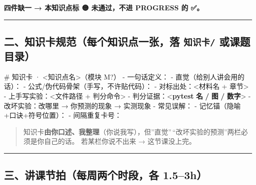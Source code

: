 \documentclass[
  chinese,
  11pt,
]{ctexart}
\newenvironment{Shaded}{}{}
\newcommand{\DataTypeTok}[1]{\textcolor[rgb]{0.56,0.13,0.00}{#1}}
\newcommand{\ErrorTok}[1]{\textcolor[rgb]{1.00,0.00,0.00}{\textbf{#1}}}
\newcommand{\FunctionTok}[1]{\textcolor[rgb]{0.02,0.16,0.49}{#1}}
\newcommand{\KeywordTok}[1]{\textcolor[rgb]{0.00,0.44,0.13}{\textbf{#1}}}
\newcommand{\NormalTok}[1]{#1}
\newcommand{\OtherTok}[1]{\textcolor[rgb]{0.00,0.44,0.13}{#1}}
\newcommand{\SpecialStringTok}[1]{\textcolor[rgb]{0.73,0.40,0.53}{#1}}
\begin{document}
\textbf{四件缺一 → 本知识点标 🟡 未通过，不进 PROGRESS 的 ✅。}

\begin{center}\rule{0.5\linewidth}{0.5pt}\end{center}

\subsection{\texorpdfstring{二、知识卡规范（每个知识点一张，落 \texttt{知识卡/} 或课题目录）}{二、知识卡规范（每个知识点一张，落 知识卡/ 或课题目录）}}\label{ux4e8cux77e5ux8bc6ux5361ux89c4ux8303ux6bcfux4e2aux77e5ux8bc6ux70b9ux4e00ux5f20ux843d-ux77e5ux8bc6ux5361-ux6216ux8bfeux9898ux76eeux5f55}

\begin{Shaded}
\begin{Highlighting}[]
\FunctionTok{\# 知识卡 · \textless{}知识点名\textgreater{}（模块 M?）}
\SpecialStringTok{{-} }\NormalTok{一句话定义：}
\SpecialStringTok{{-} }\NormalTok{直觉（给别人讲会用的话）：}
\SpecialStringTok{{-} }\NormalTok{公式/伪代码骨架（手写，不许贴代码）：}
\SpecialStringTok{{-} }\NormalTok{对标出处：\textless{}材料名 + 章节\textgreater{}}
\SpecialStringTok{{-} }\NormalTok{上手写实验：\textless{}文件路径 + 判分命令\textgreater{}}
\SpecialStringTok{{-} }\NormalTok{判分证据：}\DataTypeTok{\textless{}}\KeywordTok{pytest}\OtherTok{ }\ErrorTok{名}\OtherTok{ }\ErrorTok{/}\OtherTok{ }\ErrorTok{图}\OtherTok{ }\ErrorTok{/}\OtherTok{ }\ErrorTok{数字}\DataTypeTok{\textgreater{}}
\SpecialStringTok{{-} }\NormalTok{改坏实验：改哪里 → 你预测的现象 → 实测现象}
\SpecialStringTok{{-} }\NormalTok{常见误解：}
\SpecialStringTok{{-} }\NormalTok{记忆锚（隐喻+口诀+符号位置）：}
\SpecialStringTok{{-} }\NormalTok{间隔重复卡号：}
\end{Highlighting}
\end{Shaded}

\begin{quote}
知识卡\textbf{由你口述、我整理}（你说我写），但''直觉''\,``改坏实验的预测''两栏必须是你自己的话。 若某栏你说不出来 → 这节课没上完。
\end{quote}

\begin{center}\rule{0.5\linewidth}{0.5pt}\end{center}

\subsection{三、讲课节拍（每周两个时段，各 1.5--3h）}\label{ux4e09ux8bb2ux8bfeux8282ux62cdux6bcfux5468ux4e24ux4e2aux65f6ux6bb5ux5404-1.53h}
\end{document}
